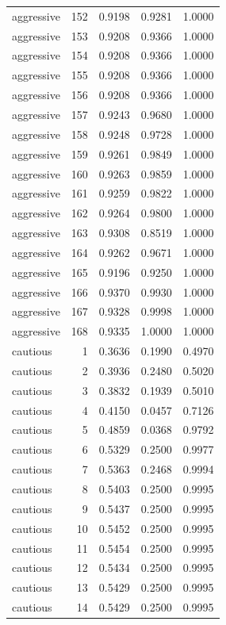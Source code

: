 \begin{tabular}{lrrrr}
aggressive & 152 & 0.9198 & 0.9281 & 1.0000 \\
aggressive & 153 & 0.9208 & 0.9366 & 1.0000 \\
aggressive & 154 & 0.9208 & 0.9366 & 1.0000 \\
aggressive & 155 & 0.9208 & 0.9366 & 1.0000 \\
aggressive & 156 & 0.9208 & 0.9366 & 1.0000 \\
aggressive & 157 & 0.9243 & 0.9680 & 1.0000 \\
aggressive & 158 & 0.9248 & 0.9728 & 1.0000 \\
aggressive & 159 & 0.9261 & 0.9849 & 1.0000 \\
aggressive & 160 & 0.9263 & 0.9859 & 1.0000 \\
aggressive & 161 & 0.9259 & 0.9822 & 1.0000 \\
aggressive & 162 & 0.9264 & 0.9800 & 1.0000 \\
aggressive & 163 & 0.9308 & 0.8519 & 1.0000 \\
aggressive & 164 & 0.9262 & 0.9671 & 1.0000 \\
aggressive & 165 & 0.9196 & 0.9250 & 1.0000 \\
aggressive & 166 & 0.9370 & 0.9930 & 1.0000 \\
aggressive & 167 & 0.9328 & 0.9998 & 1.0000 \\
aggressive & 168 & 0.9335 & 1.0000 & 1.0000 \\
cautious & 1 & 0.3636 & 0.1990 & 0.4970 \\
cautious & 2 & 0.3936 & 0.2480 & 0.5020 \\
cautious & 3 & 0.3832 & 0.1939 & 0.5010 \\
cautious & 4 & 0.4150 & 0.0457 & 0.7126 \\
cautious & 5 & 0.4859 & 0.0368 & 0.9792 \\
cautious & 6 & 0.5329 & 0.2500 & 0.9977 \\
cautious & 7 & 0.5363 & 0.2468 & 0.9994 \\
cautious & 8 & 0.5403 & 0.2500 & 0.9995 \\
cautious & 9 & 0.5437 & 0.2500 & 0.9995 \\
cautious & 10 & 0.5452 & 0.2500 & 0.9995 \\
cautious & 11 & 0.5454 & 0.2500 & 0.9995 \\
cautious & 12 & 0.5434 & 0.2500 & 0.9995 \\
cautious & 13 & 0.5429 & 0.2500 & 0.9995 \\
cautious & 14 & 0.5429 & 0.2500 & 0.9995 \\

\end{tabular}
